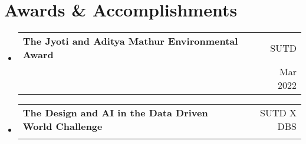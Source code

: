 \documentclass[letterpaper,11pt]{article}
\makeatletter
\newcommand{\resumeItem}[1]{
  \item\small{
    {#1 \vspace{-2.5pt}}
  }
}
\newcommand{\resumeSubheading}[4]{
  \vspace{-2pt}\item
    \begin{tabular*}{0.97\textwidth}[t]{l@{\extracolsep{\fill}}r}
      \textbf{#1} & \footnotesize{#2} \\
      {\small#3} & {\footnotesize #4} \\
    \end{tabular*}\vspace{-7pt}
}
\newcommand{\resumeProjectHeading}[2]{
    \item
    \begin{tabular*}{0.97\textwidth}{l@{\extracolsep{\fill}}r}
      \small#1 & \footnotesize#2 \\
    \end{tabular*}\vspace{-7pt}
}
\newcommand{\resumeSubHeadingListStart}{\begin{itemize}[leftmargin=0.15in, label={}]}
\newcommand{\resumeSubHeadingListEnd}{\end{itemize}}
\makeatother
\begin{document}


        






\section{Awards \& Accomplishments}
 \resumeSubHeadingListStart
    \resumeSubheading
      {The Jyoti and Aditya Mathur Environmental Award}{\footnotesize{SUTD}}
      {\normalfont{Organised SUTD's first sustainability design thinking hackathon with SG Minister as Guest of Honor}}{\footnotesize{Mar 2022}}
    \resumeSubheading
      {The Design and AI in the Data Driven World  Challenge}{SUTD X DBS}
      {\normalfont{Won 500 SGD in pitching an AI powered credit card recommendation engine in Paylah App}}{\normalfont{Sept 2021}}
  \resumeSubHeadingListEnd
\end{document}
